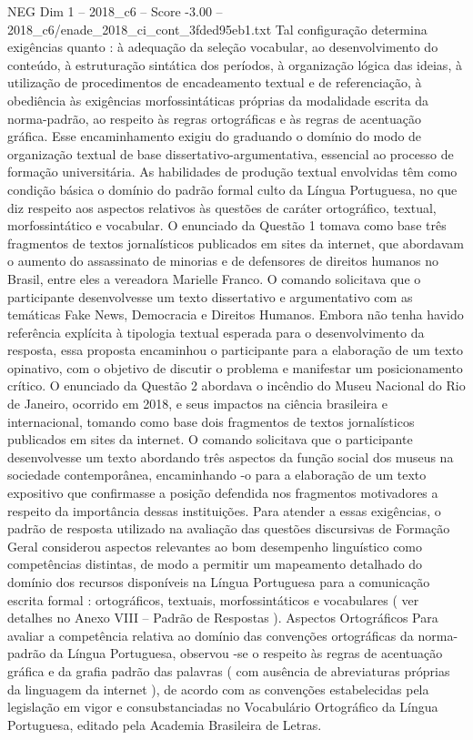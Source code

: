 \begin{textsample}{NEG Dim 1 – 2018\_c6 – Score -3.00 – 2018\_c6/enade\_2018\_ci\_cont\_3fded95eb1.txt}
Tal configuração determina exigências quanto : à adequação da seleção vocabular, ao desenvolvimento do conteúdo, à estruturação sintática dos períodos, à organização lógica das ideias, à utilização de procedimentos de encadeamento textual e de referenciação, à obediência às exigências morfossintáticas próprias da modalidade escrita da norma-padrão, ao respeito às regras ortográficas e às regras de acentuação gráfica.
Esse encaminhamento exigiu do graduando o domínio do modo de organização textual de base dissertativo-argumentativa, essencial ao processo de formação universitária.
As habilidades de produção textual envolvidas têm como condição básica o domínio do padrão formal culto da Língua Portuguesa, no que diz respeito aos aspectos relativos às questões de caráter ortográfico, textual, morfossintático e vocabular.
O enunciado da Questão 1 tomava como base três fragmentos de textos jornalísticos publicados em sites da internet, que abordavam o aumento do assassinato de minorias e de defensores de direitos humanos no Brasil, entre eles a vereadora Marielle Franco.
O comando solicitava que o participante desenvolvesse um texto dissertativo e argumentativo com as temáticas Fake News, Democracia e Direitos Humanos.
Embora não tenha havido referência explícita à tipologia textual esperada para o desenvolvimento da resposta, essa proposta encaminhou o participante para a elaboração de um texto opinativo, com o objetivo de discutir o problema e manifestar um posicionamento crítico.
O enunciado da Questão 2 abordava o incêndio do Museu Nacional do Rio de Janeiro, ocorrido em 2018, e seus impactos na ciência brasileira e internacional, tomando como base dois fragmentos de textos jornalísticos publicados em sites da internet.
O comando solicitava que o participante desenvolvesse um texto abordando três aspectos da função social dos museus na sociedade contemporânea, encaminhando -o para a elaboração de um texto expositivo que confirmasse a posição defendida nos fragmentos motivadores a respeito da importância dessas instituições.
Para atender a essas exigências, o padrão de resposta utilizado na avaliação das questões discursivas de Formação Geral considerou aspectos relevantes ao bom desempenho linguístico como competências distintas, de modo a permitir um mapeamento detalhado do domínio dos recursos disponíveis na Língua Portuguesa para a comunicação escrita formal : ortográficos, textuais, morfossintáticos e vocabulares ( ver detalhes no Anexo VIII – Padrão de Respostas ).
Aspectos Ortográficos Para avaliar a competência relativa ao domínio das convenções ortográficas da norma-padrão da Língua Portuguesa, observou -se o respeito às regras de acentuação gráfica e da grafia padrão das palavras ( com ausência de abreviaturas próprias da linguagem da internet ), de acordo com as convenções estabelecidas pela legislação em vigor e consubstanciadas no Vocabulário Ortográfico da Língua Portuguesa, editado pela Academia Brasileira de Letras.

\end{textsample}
